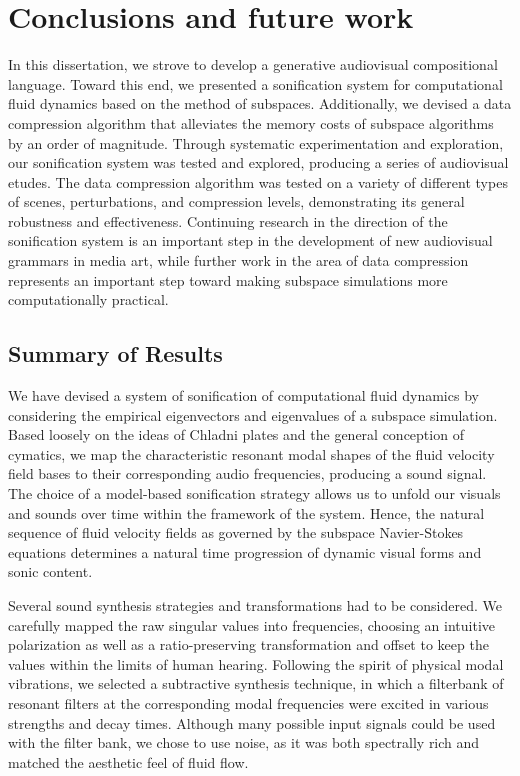 \chapter[Conclusions and future work]{Conclusions and future work}
\label{chap:chap7}

In this dissertation, we strove to develop a generative audiovisual compositional language. Toward this end, we presented a sonification system for computational fluid dynamics
based on the method of subspaces. Additionally, we devised a data compression algorithm that alleviates the memory costs of subspace algorithms by an order of magnitude. Through
systematic experimentation and exploration, our sonification system was tested and explored, producing a series of audiovisual etudes. The data compression algorithm was tested 
on a variety of different types of scenes, perturbations, and compression levels, demonstrating its general robustness and effectiveness. Continuing research in the direction of the sonification
system is an important step in the development of new audiovisual grammars in media art, while further work in the area of data compression represents an important step toward
making subspace simulations more computationally practical.

 \section{Summary of Results}
 We have devised a system of sonification of computational fluid dynamics by considering the empirical eigenvectors and eigenvalues of a subspace simulation. Based loosely on the ideas of 
 Chladni plates and the general conception of cymatics, we map the characteristic resonant modal shapes of the fluid velocity field bases to their corresponding audio frequencies,
 producing a sound signal. The choice of a model-based sonification strategy allows us to unfold our visuals and sounds over time within the framework of the system. Hence, the natural
 sequence of fluid velocity fields as governed by the subspace Navier-Stokes equations determines a natural time progression of dynamic visual forms and sonic content. 
 
 Several sound synthesis strategies and transformations had to be considered. We carefully mapped the raw singular values into frequencies,
 choosing an intuitive polarization as well as a ratio-preserving transformation and offset to keep the values within the limits of human hearing. Following the spirit of physical modal vibrations, we 
 selected a subtractive synthesis technique, in which a filterbank of resonant filters at the corresponding modal frequencies were excited in various strengths and decay times. Although many possible
 input signals could be used with the filter bank, we chose to use noise, as it was both spectrally rich and matched the aesthetic feel of fluid flow.

